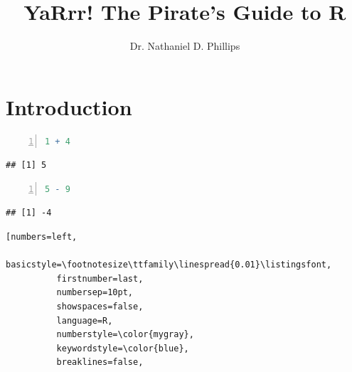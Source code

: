 \documentclass{tufte-book}\usepackage[]{graphicx}\usepackage[]{color}
\title{YaRrr! The Pirate's Guide to R}
\author{Dr. Nathaniel D. Phillips}
\makeatletter
\newenvironment{kframe}{%
 \def\at@end@of@kframe{}%
 \ifinner\ifhmode%
  \def\at@end@of@kframe{\end{minipage}}%
  \begin{minipage}{\columnwidth}%
 \fi\fi%
 \def\FrameCommand##1{\hskip\@totalleftmargin \hskip-\fboxsep
 \colorbox{shadecolor}{##1}\hskip-\fboxsep
     \hskip-\linewidth \hskip-\@totalleftmargin \hskip\columnwidth}%
 \MakeFramed {\advance\hsize-\width
   \@totalleftmargin\z@ \linewidth\hsize
   \@setminipage}}%
 {\par\unskip\endMakeFramed%
 \at@end@of@kframe}
\newenvironment{knitrout}{}{} %
\makeatother
\begin{document}


\chapter{Introduction} %


\begin{knitrout}
\color{fgcolor}\begin{kframe}
\begin{lstlisting}[numbers=left, 
          basicstyle=\footnotesize\ttfamily\linespread{0.01}\listingsfont,
          firstnumber=last, 
          numbersep=10pt, 
          showspaces=false,
          language=R,
          numberstyle=\color{mygray}, 
          keywordstyle=\color{blue},
          breaklines=false,
          aboveskip={0pt},
          belowskip={0pt},
          showstringspaces=false,
          breakatwhitespace=false,
          commentstyle=\color{purple!40!black},
          stringstyle=\color{orange}]
1 + 4\end{lstlisting}
\begin{verbatim}
## [1] 5
\end{verbatim}
\begin{lstlisting}[numbers=left, 
          basicstyle=\footnotesize\ttfamily\linespread{0.01}\listingsfont,
          firstnumber=last, 
          numbersep=10pt, 
          showspaces=false,
          language=R,
          numberstyle=\color{mygray}, 
          keywordstyle=\color{blue},
          breaklines=false,
          aboveskip={0pt},
          belowskip={0pt},
          showstringspaces=false,
          breakatwhitespace=false,
          commentstyle=\color{purple!40!black},
          stringstyle=\color{orange}]
5 - 9\end{lstlisting}
\begin{verbatim}
## [1] -4
\end{verbatim}
\begin{lstlisting}[numbers=left, 
          basicstyle=\footnotesize\ttfamily\linespread{0.01}\listingsfont,
          firstnumber=last, 
          numbersep=10pt, 
          showspaces=false,
          language=R,
          numberstyle=\color{mygray}, 
          keywordstyle=\color{blue},
          breaklines=false,

\end{lstlisting}
\end{kframe}
\end{knitrout}
\end{document}
